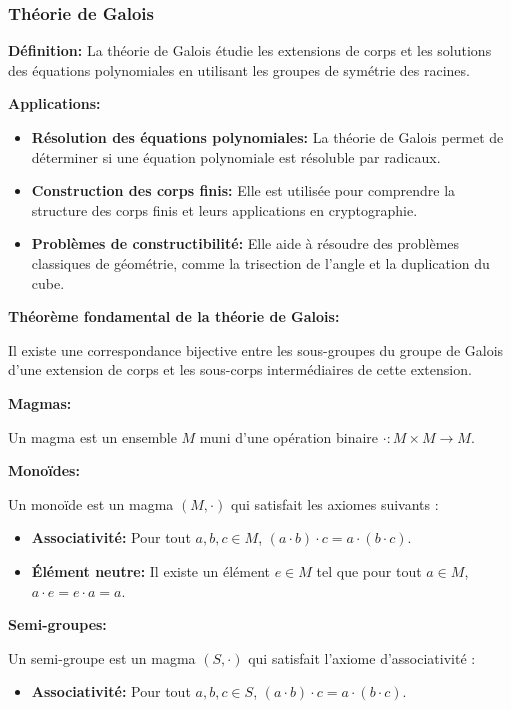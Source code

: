 \subsubsection{Théorie de Galois}

\textbf{Définition:}
La théorie de Galois étudie les extensions de corps et les solutions des équations polynomiales en utilisant les groupes de symétrie des racines.

\textbf{Applications:}
\begin{itemize}
    \item \textbf{Résolution des équations polynomiales:} La théorie de Galois permet de déterminer si une équation polynomiale est résoluble par radicaux.
    \item \textbf{Construction des corps finis:} Elle est utilisée pour comprendre la structure des corps finis et leurs applications en cryptographie.
    \item \textbf{Problèmes de constructibilité:} Elle aide à résoudre des problèmes classiques de géométrie, comme la trisection de l'angle et la duplication du cube.
\end{itemize}

\textbf{Théorème fondamental de la théorie de Galois:}

Il existe une correspondance bijective entre les sous-groupes du groupe de Galois d'une extension de corps et les sous-corps intermédiaires de cette extension.


\textbf{Magmas:}

Un magma est un ensemble $M$ muni d'une opération binaire $\cdot : M \times M \to M$.

\textbf{Monoïdes:}

Un monoïde est un magma $(M, \cdot)$ qui satisfait les axiomes suivants :
\begin{itemize}
    \item \textbf{Associativité:} Pour tout $a, b, c \in M$, $(a \cdot b) \cdot c = a \cdot (b \cdot c)$.
    \item \textbf{Élément neutre:} Il existe un élément $e \in M$ tel que pour tout $a \in M$, $a \cdot e = e \cdot a = a$.
\end{itemize}

\textbf{Semi-groupes:}


Un semi-groupe est un magma $(S, \cdot)$ qui satisfait l'axiome d'associativité :
\begin{itemize}
    \item \textbf{Associativité:} Pour tout $a, b, c \in S$, $(a \cdot b) \cdot c = a \cdot (b \cdot c)$.
\end{itemize}

